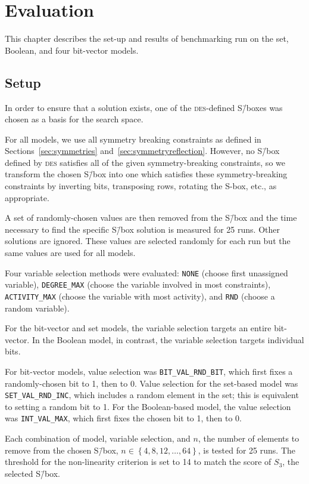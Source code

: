\documentclass[a4paper,10pt,twoside,openright]{book}
\renewcommand{\sc}[1]{\textsc{\lowercase{#1}}}
\newcommand{\set}[1]{\left\{#1\right\}}
\newcommand*\cd[1]{\texttt{#1}}
\begin{document}
\chapter{Evaluation}
\label{sec:results}

This chapter describes the set-up and results of benchmarking run on the 
set, Boolean, and four bit-vector models.

\section{Setup}

In order to ensure that a solution exists, one of the \sc{DES}-defined 
S\=/boxes was chosen as a basis for the search space. 

For all models, we use all symmetry breaking constraints as defined in
Sections~\ref{sec:symmetries} and~\ref{sec:symmetryreflection}.
However, no S\=/box defined by \sc{DES} 
satisfies all of the given symmetry-breaking constraints,
so we transform the chosen S\=/box into one which 
satisfies these symmetry-breaking constraints
by inverting bits, transposing rows, rotating the S-box, etc., as appropriate.

A set of randomly-chosen values are then removed from the S\=/box and the 
time necessary to find the specific S\=/box solution
is measured for 25 runs.
Other solutions are ignored.
These values are selected randomly for each run but the same values are used 
for all models.

Four variable selection methods were evaluated: \cd{NONE} (choose first unassigned variable), \cd{DEGREE_MAX} (choose the variable involved in most constraints), \cd{ACTIVITY_MAX} (choose the variable with most activity), and \cd{RND} (choose a random variable).

For the bit-vector and set models, the variable selection targets an entire bit-vector. 
In the Boolean model, in contrast, the variable selection targets individual bits.

For bit-vector models, value selection was \cd{BIT_VAL_RND_BIT}, which first fixes a randomly-chosen bit to 1, then to 0.
Value selection for the set-based model was \cd{SET_VAL_RND_INC}, which includes a random element in the set; this is equivalent to setting a random bit to 1. 
For the Boolean-based model, the value selection was \cd{INT_VAL_MAX}, which first fixes the chosen bit to 1, then to 0.

Each combination of model, variable selection, and $n$, the number of elements to remove from the chosen S\=/box, 
$n \in \set{4,8,12,\ldots,64}$,
is tested for 25 runs.
The threshold for the non-linearity criterion is set to 14 to match the score of $S_3$, the selected S\=/box.
\end{document}
